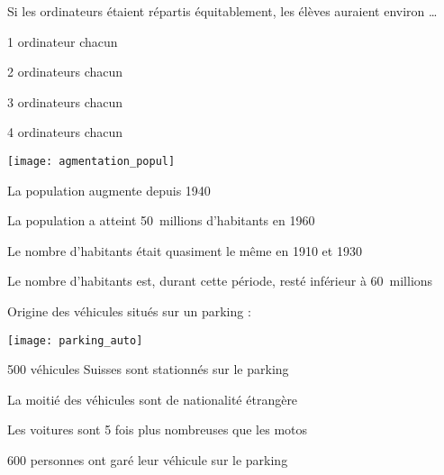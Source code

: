 \begin{QCM}
\begin{GroupeQCM}
    
    \begin{exercice}
      Si les ordinateurs étaient répartis équitablement, les élèves auraient environ \ldots
      \begin{ChoixQCM}{4}
      \item 1 ordinateur chacun
      \item 2 ordinateurs chacun 
      \item 3 ordinateurs chacun
      \item 4 ordinateurs chacun
      \end{ChoixQCM}
\begin{corrige}
   \end{corrige}
    \end{exercice}
    
    
    \begin{exercice}
      \begin{center} \texttt{[image: agmentation\_popul]} \end{center}
      \begin{ChoixQCM}{4}
      \item La population augmente depuis 1940
      \item La population a atteint 50 millions d'habitants en 1960
      \item Le nombre d'habitants était quasiment le même en 1910 et 1930
      \item Le nombre d'habitants est, durant cette période, resté inférieur à 60 millions
      \end{ChoixQCM}
\begin{corrige}
   \end{corrige}
    \end{exercice}
 
 
    \begin{exercice}
    Origine des véhicules situés sur un parking : \hspace{1em} 
    \begin{minipage}[c]{4cm}
    \texttt{[image: parking\_auto]}
    \end{minipage}
      \begin{ChoixQCM}{4}
      \item 500 véhicules Suisses sont stationnés sur le parking
      \item La moitié des véhicules sont de nationalité étrangère
      \item Les voitures sont 5 fois plus nombreuses que les motos
      \item 600 personnes ont garé leur véhicule sur le parking
      \end{ChoixQCM}
\begin{corrige}
   \end{corrige}
    \end{exercice}
    

\end{GroupeQCM}
\end{QCM}

  
